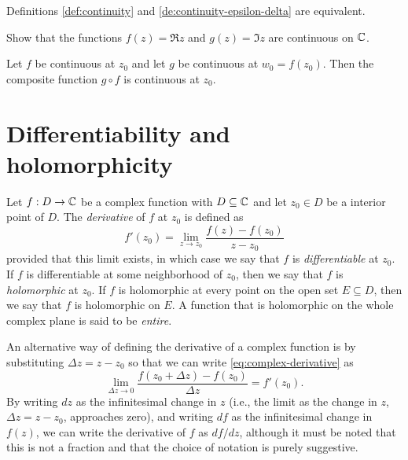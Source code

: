 \begin{theorem}%
    Definitions {\normalfont\ref{def:continuity}} and {\normalfont\ref{de:continuity-epsilon-delta}} are equivalent.
\end{theorem}

\begin{example}
    Show that the functions \(f(z) = \Re z\) and \(g(z) = \Im z\) are continuous on \(\mathbb{C}\).
\end{example}

\begin{theorem}%
    \label{thm:continuity-composite}
    Let \(f\) be continuous at \(z_0\) and let \(g\) be continuous at \(w_0 = f(z_0)\). Then the composite function \(g \circ f\) is continuous at \(z_0\). 
\end{theorem}


\section{Differentiability and holomorphicity}

\begin{definition} \label{def:complex-derivative}
    Let \(f : D \to \mathbb{C}\) be a complex function with \(D \subseteq \mathbb{C}\) and let \(z_0 \in D\) be a interior point of \(D\). The \emph{derivative} of \(f\) at \(z_0\) is defined as
    \begin{equation}
        f'(z_0) = \lim_{z \to z_0} \frac{f(z) - f(z_0)}{z - z_0}\label{eq:complex-derivative}
    \end{equation}
    provided that this limit exists, in which case we say that \(f\) is \emph{differentiable} at \(z_0\). If \(f\) is differentiable at some neighborhood of \(z_0\), then we say that \(f\) is \emph{holomorphic} at \(z_0\). If \(f\) is holomorphic at every point on the open set \(E \subseteq D\), then we say that \(f\) is holomorphic on \(E\). A function that is holomorphic on the whole complex plane is said to be \emph{entire}.
\end{definition}

An alternative way of defining the derivative of a complex function is by substituting \(\Delta z = z - z_0\) so that we can write
\eqref{eq:complex-derivative} as
\[
    \lim_{\Delta z \to 0} \frac{f(z_0 + \Delta z) - f(z_0)}{\Delta z} = f'(z_0).
    \label{eq:complex-derivative-delta-z}
\]
By writing \(dz\) as the infinitesimal change in \(z\) (i.e., the limit as the change in \(z\), \(\Delta z = z - z_0\), approaches zero), and writing \(df\) as the infinitesimal change in \(f(z)\), we can write the derivative of \(f\) as \(df/dz\), although it must be noted that this is not a fraction and that the choice of notation is purely suggestive.

